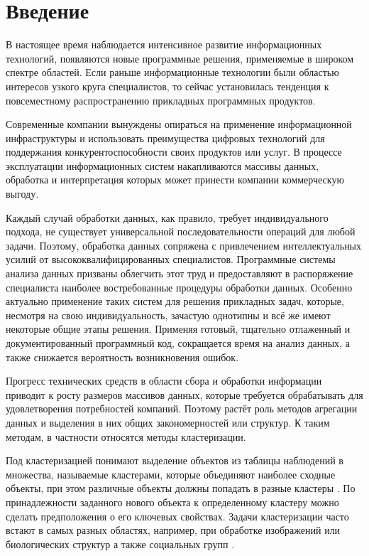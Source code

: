 \documentclass[12pt]{diploma}
\begin{document}
	
		
	
	\tableofcontents 
	
	\newpage
		
	\section{Введение}
		В настоящее время наблюдается интенсивное развитие информационных технологий, появляются новые программные решения, применяемые в широком спектре областей. Если раньше информационные технологии были областью интересов узкого круга специалистов, то сейчас установилась тенденция к повсеместному распространению прикладных программных продуктов. 
		
		Современные компании вынуждены опираться на применение информационной инфраструктуры и использовать преимущества цифровых технологий для поддержания конкурентоспособности своих продуктов или услуг. В процессе эксплуатации информационных систем накапливаются массивы данных, обработка и интерпретация которых может принести компании коммерческую выгоду. 
		
		Каждый случай обработки данных, как правило, требует индивидуального подхода, не существует универсальной последовательности операций для любой задачи. Поэтому, обработка данных сопряжена с привлечением интеллектуальных усилий от высококвалифицированных специалистов. Программные системы анализа данных призваны облегчить этот труд и предоставляют в распоряжение специалиста наиболее востребованные процедуры обработки данных. Особенно актуально применение таких систем для решения прикладных задач, которые, несмотря на свою индивидуальность, зачастую однотипны и всё же имеют некоторые общие этапы решения. Применяя готовый, тщательно отлаженный и документированный программный код, сокращается время на анализ данных, а также снижается вероятность возникновения ошибок. 

		Прогресс технических средств в области сбора и обработки информации приводит к росту размеров массивов данных, которые требуется обрабатывать для удовлетворения потребностей компаний. Поэтому растёт роль методов агрегации данных и выделения в них общих закономерностей или структур. К таким методам, в частности относятся методы кластеризации. 
		
		Под кластеризацией понимают выделение объектов из таблицы наблюдений в множества, называемые кластерами, которые объединяют наиболее сходные объекты, при этом различные объекты должны попадать в разные кластеры \cite{mirkin-ds}. По принадлежности заданного нового объекта к определенному кластеру можно сделать предположения о его ключевых свойствах. Задачи кластеризации часто встают в самых разных областях, например, при обработке изображений или биологических структур а также социальных групп \cite{mirkin-clustering}.
		
\end{document}
